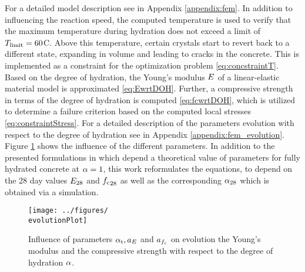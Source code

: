 For a detailed model description see in Appendix \ref{appendix:fem}.
In addition to influencing the reaction speed, the computed temperature is used to verify that the maximum temperature during hydration does not exceed a limit of $T_{\text{limit}} = 60$\textdegree C.
Above this temperature, certain crystals start to revert back to a different state, expanding in volume and leading to cracks in the concrete.
This is implemented as a constraint for the optimization problem \eqref{eq:concstraintT}.
Based on the degree of hydration, the Young's modulus $E$ of a linear-elastic material model
is approximated \eqref{eq:EwrtDOH}.
Further, a compressive strength in terms of the degree of hydration is computed \eqref{eq:fcwrtDOH}, which is utilized to determine a failure criterion based on the computed local stresses \eqref{eq:constraintStress}.
For a detailed description of the parameters evolution with respect to the degree of hydration see in Appendix \ref{appendix:fem_evolution}.
Figure \ref{fig:parameterEvolution} shows the influence of the different parameters.
In addition to the presented formulations in \cite{car_2016_mamt} which depend a theoretical value of parameters for fully hydrated concrete at $\alpha = 1$, this work reformulates the equations, to depend on the 28 day values $E_{28}$ and ${f_{\text{c}}}_{28}$ as well as the corresponding $\alpha_{28}$ which is obtained via a simulation.
\begin{figure}[h]%
	\centering
	\texttt{[image: ../figures/\\evolutionPlot]}
	\caption{Influence of parameters $\alpha_{\text{t}}, a_{E}$ and $a_{f_{\text{c}}}$ on evolution the Young's modulus and the compressive strength with respect to the degree of hydration $\alpha$. }\label{fig:parameterEvolution}
\end{figure}